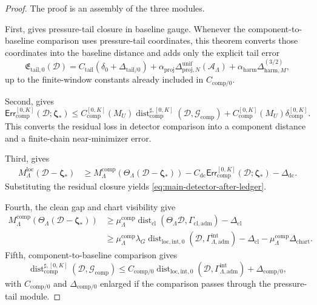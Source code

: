 \documentclass[10pt,a4paper]{amsart}
\newcommand{\Dist}{\operatorname{dist}}
\newcommand{\Err}{\mathsf{Err}}
\newcommand{\adm}{\mathrm{adm}}
\newcommand{\bzeta}{\boldsymbol\zeta}
\newcommand{\calA}{\mathcal A}
\newcommand{\calD}{\mathcal D}
\newcommand{\calG}{\mathcal G}
\newcommand{\cl}{\mathrm{cl}}
\newcommand{\comp}{\mathrm{comp}}
\newcommand{\harm}{\mathrm{harm}}
\newcommand{\intg}{\mathrm{int}}
\newcommand{\loc}{\mathrm{loc}}
\newcommand{\proj}{\mathrm{proj}}
\newcommand{\tail}{\mathrm{tail}}
\begin{document}
\begin{proof}
The proof is an assembly of the three modules.

First,  gives pressure-tail closure in baseline gauge.  Whenever the component-to-baseline comparison uses pressure-tail coordinates, this theorem converts those coordinates into the baseline distance and adds only the explicit tail error
\[
        \mathfrak E_{\tail,0}(\calD)
        =
        C_{\tail}(\delta_0+\Delta_{\tail/0})
        +
        \alpha_{\proj}\Delta^{\mathrm{unif}}_{\proj,N}(\calA_\Lambda)
        +
        \alpha_{\harm}\Delta^{(3/2)}_{\harm,M},
\]
up to the finite-window constants already included in \(C_{\comp/0}\).

Second,  gives
\[
        \Err_{\comp}^{[0,K]}(\calD;\bzeta_*)
        \le
        C_{\comp}^{[0,K]}(M_U)
        \Dist_{\comp}^{\sharp,[0,K]}(\calD,\calG_{\comp})
        +
        C_{\comp}^{[0,K]}(M_U)
        \delta_{\comp}^{[0,K]}.
\]
This converts the residual loss in detector comparison into a component distance and a finite-chain near-minimizer error.

Third,  gives
\[
\begin{aligned}
        M_{\Lambda}^{\loc}(\calD-\bzeta_*)
        &\ge
        M_{\Lambda}^{\comp}(\Theta_\Lambda(\calD-\bzeta_*))
        -C_{\mathrm{dc}}
        \Err_{\comp}^{[0,K]}(\calD;\bzeta_*)
        -\Delta_{\mathrm{dc}}.
\end{aligned}
\]
Substituting the residual closure yields \eqref{eq:main-detector-after-ledger}.

Fourth, the clean gap and chart visibility give
\[
\begin{aligned}
        M_{\Lambda}^{\comp}(\Theta_\Lambda(\calD-\bzeta_*))
        &\ge
        \mu_\Lambda^{\comp}
        \Dist_{\cl}(\Theta_\Lambda\calD,\Gamma_{\cl,\adm})
        -\Delta_{\cl}\\
        &\ge
        \mu_\Lambda^{\comp}\lambda_G
        \Dist_{\loc,\intg,0}(\calD,\Gamma^{\intg}_{\Lambda,\adm})
        -\Delta_{\cl}
        -\mu_\Lambda^{\comp}\Delta_{\mathrm{chart}}.
\end{aligned}
\]
Fifth, component-to-baseline comparison gives
\[
        \Dist_{\comp}^{\sharp,[0,K]}(\calD,\calG_{\comp})
        \le
        C_{\comp/0}
        \Dist_{\loc,\intg,0}(\calD,\Gamma^{\intg}_{\Lambda,\adm})
        +\Delta_{\comp/0},
\]
with \(C_{\comp/0}\) and \(\Delta_{\comp/0}\) enlarged if the comparison passes through the pressure-tail module.


\end{proof}
\end{document}
